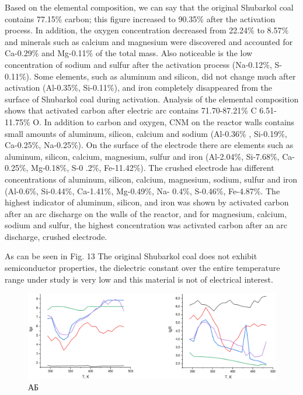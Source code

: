 \begin{multicols}{2}
Based on the elemental composition, we can say that the original
Shubarkol coal contains 77.15\% carbon; this figure increased to 90.35\%
after the activation process. In addition, the oxygen concentration
decreased from 22.24\% to 8.57\% and minerals such as calcium and
magnesium were discovered and accounted for Ca-0.29\% and Mg-0.11\% of
the total mass. Also noticeable is the low concentration of sodium and
sulfur after the activation process (Na-0.12\%, S-0.11\%). Some
elements, such as aluminum and silicon, did not change much after
activation (Al-0.35\%, Si-0.11\%), and iron completely disappeared from
the surface of Shubarkol coal during activation. Analysis of the
elemental composition shows that activated carbon after electric arc
contains 71.70-87.21\% C 6.51-11.75\% O. In addition to carbon and
oxygen, CNM on the reactor walls contains small amounts of aluminum,
silicon, calcium and sodium (Al-0.36\% , Si-0.19\%, Ca-0.25\%,
Na-0.25\%). On the surface of the electrode there are elements such as
aluminum, silicon, calcium, magnesium, sulfur and iron (Al-2.04\%,
Si-7.68\%, Ca-0.25\%, Mg-0.18\%, S-0 .2\%, Fe-11.42\%). The crushed
electrode has different concentrations of aluminum, silicon, calcium,
magnesium, sodium, sulfur and iron (Al-0.6\%, Si-0.44\%, Ca-1.41\%,
Mg-0.49\%, Na- 0.4\%, S-0.46\%, Fe-4.87\%. The highest indicator of
aluminum, silicon, and iron was shown by activated carbon after an arc
discharge on the walls of the reactor, and for magnesium, calcium,
sodium and sulfur, the highest concentration was activated carbon after
an arc discharge, crushed electrode.

As can be seen in Fig. 13 The original Shubarkol coal does not exhibit
semiconductor properties, the dielectric constant over the entire
temperature range under study is very low and this material is not of
electrical interest.
\end{multicols}

\begin{figure}[H]
	\centering
	\includegraphics[width=\textwidth]{assets/65}
	\caption*{А\hspace{8cm}Б}
\end{figure}

